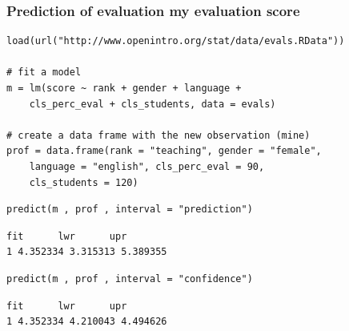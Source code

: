 \documentclass[11pt,containsverbatim,handout,xcolor=xelatex,dvipsnames,table]{beamer}
\begin{document}

\begin{frame}[fragile]
\frametitle{Prediction of evaluation my evaluation score}

\vspace{-0.2cm}

{\scriptsize
\begin{Verbatim}[frame=single, formatcom=\color{blue}]
load(url("http://www.openintro.org/stat/data/evals.RData"))

# fit a model
m = lm(score ~ rank + gender + language + 
    cls_perc_eval + cls_students, data = evals)

# create a data frame with the new observation (mine)
prof = data.frame(rank = "teaching", gender = "female", 
    language = "english", cls_perc_eval = 90, 
    cls_students = 120)
\end{Verbatim}
}

\pause

{\scriptsize
\begin{Verbatim}[frame=single, formatcom=\color{blue}]
predict(m , prof , interval = "prediction")
\end{Verbatim}
}

\pause

{\scriptsize
\begin{Verbatim}[frame=single, formatcom=\color{gray}]
       fit      lwr      upr
1 4.352334 3.315313 5.389355
\end{Verbatim}
}

\pause

{\scriptsize
\begin{Verbatim}[frame=single, formatcom=\color{blue}]
predict(m , prof , interval = "confidence")
\end{Verbatim}
}

\pause

{\scriptsize
\begin{Verbatim}[frame=single, formatcom=\color{gray}]
       fit      lwr      upr
1 4.352334 4.210043 4.494626
\end{Verbatim}
}

\end{frame}

\end{document}
